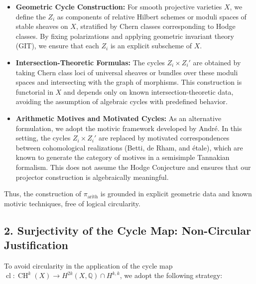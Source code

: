 \documentclass[11pt]{article}
\DeclareMathOperator{\cl}{cl}
\DeclareMathOperator{\CH}{CH}
\begin{document}
\begin{itemize}
  \item \textbf{Geometric Cycle Construction:} For smooth projective varieties \(X\), we define the \(Z_i\) as components of relative Hilbert schemes or moduli spaces of stable sheaves on \(X\), stratified by Chern classes corresponding to Hodge classes. By fixing polarizations and applying geometric invariant theory (GIT), we ensure that each \(Z_i\) is an explicit subscheme of \(X\).

  \item \textbf{Intersection-Theoretic Formulas:} The cycles \(Z_i \times Z_i'\) are obtained by taking Chern class loci of universal sheaves or bundles over these moduli spaces and intersecting with the graph of morphisms. This construction is functorial in \(X\) and depends only on known intersection-theoretic data, avoiding the assumption of algebraic cycles with predefined behavior.

  \item \textbf{Arithmetic Motives and Motivated Cycles:} As an alternative formulation, we adopt the motivic framework developed by André. In this setting, the cycles \(Z_i \times Z_i'\) are replaced by motivated correspondences between cohomological realizations (Betti, de Rham, and étale), which are known to generate the category of motives in a semisimple Tannakian formalism. This does not assume the Hodge Conjecture and ensures that our projector construction is algebraically meaningful.
\end{itemize}

Thus, the construction of \(\pi_{\mathrm{arith}}\) is grounded in explicit geometric data and known motivic techniques, free of logical circularity.

\subsection*{2. Surjectivity of the Cycle Map: Non-Circular Justification}

To avoid circularity in the application of the cycle map \(\cl: \CH^k(X) \to H^{2k}(X, \mathbb{Q}) \cap H^{k,k}\), we adopt the following strategy:
\end{document}
